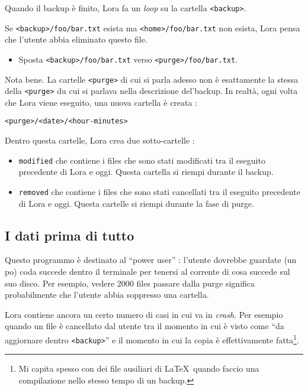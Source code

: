 \documentclass[a4paper,12pt]{article}
\newcommand{\info}[1]{\texttt{#1}}
\begin{document}
Quando il backup è finito, Lora fa un \emph{loop} su la cartella \info{<backup>}.

Se \info{<backup>/foo/bar.txt} esista ma \info{<home>/foo/bar.txt} non esista, Lora pensa che l'utente abbia eliminato questo file.
\begin{itemize}
    \item 
        Sposta \info{<backup>/foo/bar.txt} verso \info{<purge>/foo/bar.txt}.
\end{itemize}

Nota bene. La cartelle \info{<purge>} di cui si parla adesso non è esattamente la stessa della \info{<purge>} du cui si parlava nella descrizione del'backup. In realtà, ogni volta che Lora viene eseguito, una nuova cartella è creata : 

\begin{center}
    \info{<purge>/<date>/<hour-minutes>}
\end{center}
Dentro questa cartelle, Lora crea due sotto-cartelle :
\begin{itemize}
    \item 
        \info{modified}  che contiene i files che sono stati modificati tra il eseguito precedente di Lora e oggi. Questa cartella si riempi durante il backup.
\item
    \info{removed} che contiene i files che sono stati cancellati tra il eseguito precedente di Lora e oggi. Questa cartelle si riempi durante la fase di purge.
\end{itemize}

\subsection{I dati prima di tutto}

Questo programmo è destinato al ``power user'' : l'utente dovrebbe guardate (un po) coda succede dentro il terminale per tenersi al corrente di cosa succede sul suo disco. Per esempio, vedere \( 2000\) files passare dalla purge significa probabilmente che l'utente abbia soppresso una cartella.

Lora contiene ancora un certo numero di casi in cui va in \emph{crash}. Per esempio quando un file è cancellato dal utente tra il momento in cui è visto come ``da aggiornare dentro \info{<backup>}'' e il momento in cui la copia è effettivamente fatta\footnote{Mi capita spesso con dei file ausiliari di \LaTeX\ quando faccio una compilazione nello stesso tempo di un backup.}.
\end{document}
